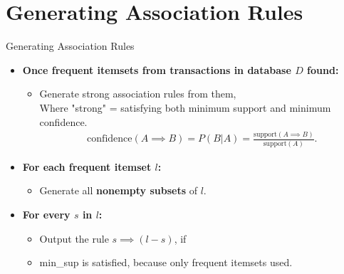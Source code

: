 \section{Generating Association Rules}

\begin{frame}{Generating Association Rules}
	\begin{itemize}
		\item \textbf{Once frequent itemsets from transactions in
			      database $D$ found:}
		      \begin{itemize}
			      \item Generate strong association rules from them,\\
			            Where "strong" = satisfying both minimum support and
			            minimum confidence.
			            \begin{align*}
				            \text{confidence}(A \implies B) = P(B|A) = \frac{\text{support}(A \implies B)}{\text{support}(A)}.
			            \end{align*}
		      \end{itemize}
		\item \textbf{For each frequent itemset $l$:}
		      \begin{itemize}
			      \item Generate all \textbf{nonempty subsets} of $l$.
		      \end{itemize}
		\item \textbf{For every $s$ in $l$:}
		      \begin{itemize}
			      \item Output the rule $s \implies (l - s)$, if
			      \item min\_sup is satisfied, because only frequent itemsets
			            used.
		      \end{itemize}
	\end{itemize}
\end{frame}
